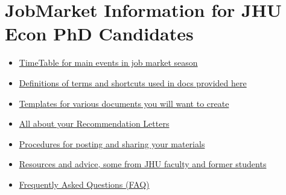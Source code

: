 \documentclass{\classes/econtex}
\begin{document}
\medskip


\section*{JobMarket Information for JHU Econ PhD Candidates}

\begin{itemize}
  \item \href{\pageurl/TimeTable}{TimeTable for main events in job market season}
  \item \href{\pageurl/Notation}{Definitions of terms and shortcuts used in docs provided here}
  \item \href{\bloburl/Templates}{Templates for various documents you will want to create}
  \item \href{\pageurl/RecLetters}{All about your Recommendation Letters}
  \item \href{\bloburl/JobMarketProceduresHelp.md}{Procedures for posting and sharing your materials}
  \item \href{\bloburl/Resources}{Resources and advice, some from JHU faculty and former students}
  \item \href{\pageurl/FAQ}{Frequently Asked Questions (FAQ)}
\end{itemize}
\end{document}
